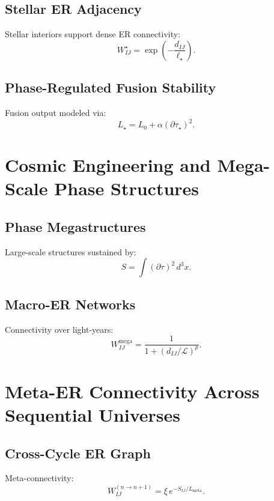 \section{Stellar ER Adjacency}
Stellar interiors support dense ER connectivity:
\[
W_{IJ}^{\star} = \exp\!\left(-\frac{d_{IJ}}{\ell_\star}\right).
\]

\section{Phase-Regulated Fusion Stability}
Fusion output modeled via:
\[
L_\star = L_0 + \alpha (\partial\tau_\star)^2.
\]



\chapter{Cosmic Engineering and Mega-Scale Phase Structures}

\section{Phase Megastructures}
Large-scale structures sustained by:
\[
S = \int (\partial\tau)^2\, d^3x.
\]

\section{Macro-ER Networks}
Connectivity over light-years:
\[
W_{IJ}^{\mathrm{mega}} = \frac{1}{1 + (d_{IJ}/\mathcal{L})^p }.
\]


\chapter{Meta-ER Connectivity Across Sequential Universes}

\section{Cross-Cycle ER Graph}
Meta-connectivity:
\[
W^{(n\rightarrow n+1)}_{IJ} = \xi\, e^{-S_{IJ}/L_{\mathrm{meta}}}.
\]

